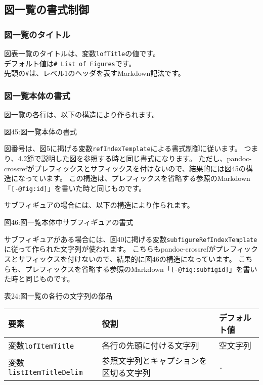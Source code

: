 \subsection{図一覧の書式制御}\label{ux56f3ux4e00ux89a7ux306eux66f8ux5f0fux5236ux5fa1}

\subsubsection{図一覧のタイトル}\label{ux56f3ux4e00ux89a7ux306eux30bfux30a4ux30c8ux30eb}

図表一覧のタイトルは、変数\texttt{lofTitle}の値です。\\
デフォルト値は\texttt{\#\ List\ of\ Figures}です。\\
先頭の\texttt{\#}は、レベル1のヘッダを表すMarkdown記法です。

\subsubsection{図一覧本体の書式}\label{ux56f3ux4e00ux89a7ux672cux4f53ux306eux66f8ux5f0f}

図一覧の各行は、以下の構造により作られます。

図45:図一覧本体の書式

図番号は、図5に掲げる変数\texttt{refIndexTemplate}による書式制御に従います。
つまり、4.2節で説明した図を参照する時と同じ書式になります。
ただし、pandoc-crossrefがプレフィックスとサフィックスを付けないので、結果的には図45の構造になっています。
この構造は、プレフィックスを省略する参照のMarkdown「\texttt{{[}-@fig:id{]}}」を書いた時と同じものです。

サブフィギュアの場合には、以下の構造により作られます。

図46:図一覧本体中サブフィギュアの書式

サブフィギュアがある場合には、図40に掲げる変数\texttt{subfigureRefIndexTemplate}に従って作られた文字列が使われます。
こちらもpandoc-crossrefがプレフィックスとサフィックスを付けないので、結果的に図46の構造になっています。
こちらも、プレフィックスを省略する参照のMarkdown「\texttt{{[}-@fig:subfigid{]}}」を書いた時と同じものです。

表24:図一覧の各行の文字列の部品

\begin{longtable}[]{@{}lll@{}}
\toprule\noalign{}
要素 & 役割 & デフォルト値 \\
\midrule\noalign{}
\endhead
\bottomrule\noalign{}
\endlastfoot
変数\texttt{lofItemTitle} & 各行の先頭に付ける文字列 & 空文字列 \\
変数\texttt{listItemTitleDelim} & 参照文字列とキャプションを区切る文字列
& \texttt{.} \\
\end{longtable}

